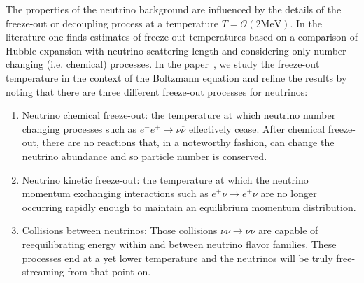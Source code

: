 The properties of the neutrino background are influenced by the details of the freeze-out or decoupling process at a temperature $T=\mathcal{O}(2\mathrm{MeV})$. In the literature one finds estimates of freeze-out temperatures based on a comparison of Hubble expansion with neutrino scattering length and considering only number changing (i.e. chemical) processes. In the paper~\cite{Birrell:2014uka}, we study the freeze-out temperature in the context of the Boltzmann equation and refine the results by noting that there are three different freeze-out processes for neutrinos:
\begin{enumerate}
\item Neutrino chemical freeze-out: the temperature at which neutrino number changing processes such as $e^-e^+\to\nu\overline\nu$ effectively cease. After chemical freeze-out, there are no reactions that, in a noteworthy fashion, can
change the neutrino abundance and so particle number is conserved. %
%
\item Neutrino kinetic freeze-out: the temperature at which the neutrino momentum exchanging interactions such as $e^\pm\nu\to e^\pm\nu$ are no longer occurring rapidly enough to maintain an equilibrium momentum distribution. %

\item Collisions between neutrinos:
Those collisions $\nu\nu\to\nu\nu$ are capable of reequilibrating energy within and between neutrino flavor families. These processes end at a yet lower temperature and the neutrinos will be truly free-streaming from that point on.
 

\end{enumerate}
